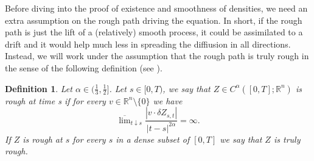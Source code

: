 \documentclass[11pt,a4paper]{article}
\newcommand{\R}{\mathbb{R}}
\newtheorem{defn}{Definition}[section]
\theoremstyle{plain}
\newtheorem{rmk}[defn]{Remark}
\newtheorem{assumptions}[defn]{Assumptions}
\begin{document}


Before diving into the proof of existence and smoothness of densities, we need an extra assumption on the rough path driving the equation. In short, if the rough path is just the lift of a (relatively) smooth process, it could be assimilated to a drift and it would help much less in spreading the diffiusion in all directions. Instead, we will work under the assumption that the rough path is truly rough in the sense of the following definition (see \cite[Definition 6.3]{FH20}).

\begin{defn}
    \label{def: truly rough}
    Let $\alpha \in (\frac{1}{3},\frac{1}{2}]$. Let $s\in [0,T)$, we say that $Z \in C^\alpha([0,T];\R^n)$
    is \textit{rough at time s} if for every $v \in \R^n \setminus \{0\}$ we have
    \begin{equation*}
        \overline{\lim}_{t\downarrow s} \frac{|v\cdot \delta Z_{s,t}|}{|t-s|^{2\alpha}} = \infty.
    \end{equation*}
    If ${Z}$ is rough at $s$ for every $s$ in a dense subset of $[0,T]$ we say that ${Z}$ is \textit{truly rough}.
\end{defn}
\end{document}
